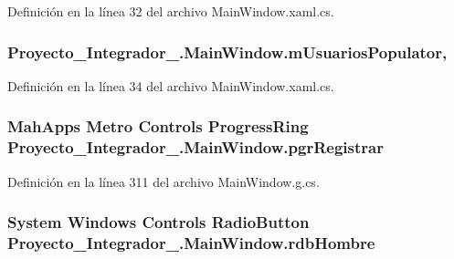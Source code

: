 Definición en la línea 32 del archivo Main\-Window.\-xaml.\-cs.

\hypertarget{class_proyecto___integrador__3_1_1_main_window_a3c9586e06a8edee79c1217a3985b4b68}{
\subsubsection[{m\-Usuarios\-Populator}]{ Proyecto\-\_\-\-Integrador\-\_.\-Main\-Window.\-m\-Usuarios\-Populator\hspace{0.3cm}{\ttfamily [static]}, {\ttfamily [private]}}}\label{class_proyecto___integrador__3_1_1_main_window_a3c9586e06a8edee79c1217a3985b4b68}


Definición en la línea 34 del archivo Main\-Window.\-xaml.\-cs.

\hypertarget{class_proyecto___integrador__3_1_1_main_window_a3013e3941492422c2fb9151f99f5d3ef}{
\subsubsection[{pgr\-Registrar}]{\setlength{\rightskip}{0pt plus 5cm}Mah\-Apps Metro Controls Progress\-Ring Proyecto\-\_\-\-Integrador\-\_.\-Main\-Window.\-pgr\-Registrar\hspace{0.3cm}{\ttfamily [package]}}}\label{class_proyecto___integrador__3_1_1_main_window_a3013e3941492422c2fb9151f99f5d3ef}


Definición en la línea 311 del archivo Main\-Window.\-g.\-cs.

\hypertarget{class_proyecto___integrador__3_1_1_main_window_a18bdb73ede87b12a96e18de224a8d780}{
\subsubsection[{rdb\-Hombre}]{\setlength{\rightskip}{0pt plus 5cm}System Windows Controls Radio\-Button Proyecto\-\_\-\-Integrador\-\_.\-Main\-Window.\-rdb\-Hombre\hspace{0.3cm}{\ttfamily [package]}}}\label{class_proyecto___integrador__3_1_1_main_window_a18bdb73ede87b12a96e18de224a8d780}


